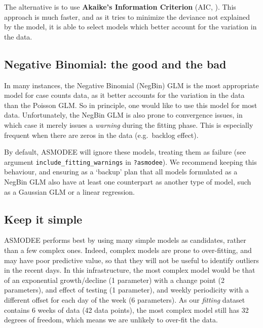\documentclass[]{book}
\begin{document}
The alternative is to use \textbf{Akaike's Information Criterion} (AIC,
\citep{Akaike1974-gm}). This approach is much faster, and as it tries to minimize the
deviance not explained by the model, it is able to select models which better
account for the variation in the data.

\hypertarget{negative-binomial-the-good-and-the-bad}{%
\subsection{Negative Binomial: the good and the bad}\label{negative-binomial-the-good-and-the-bad}}

In many instances, the Negative Binomial (NegBin) GLM is the most appropriate
model for case counts data, as it better accounts for the variation in the data
than the Poisson GLM. So in principle, one would like to use this model for most
data. Unfortunately, the NegBin GLM is also prone to convergence issues, in
which case it merely issues a \emph{warning} during the fitting phase. This is
especially frequent when there are zeros in the data (e.g.~backlog effect).

By default, ASMODEE will ignore these models, treating them as failure (see
argument \texttt{include\_fitting\_warnings} in \texttt{?asmodee}). We recommend keeping this
behaviour, and ensuring as a `backup' plan that all models formulated as a
NegBin GLM also have at least one counterpart as another type of model, such as
a Gaussian GLM or a linear regression.

\hypertarget{keep-it-simple}{%
\subsection{Keep it simple}\label{keep-it-simple}}

ASMODEE performs best by using many simple models as candidates, rather than a
few complex ones. Indeed, complex models are prone to over-fitting, and may have
poor predictive value, so that they will not be useful to identify outliers in
the recent days. In this infrastructure, the most complex model would be that of
an exponential growth/decline (1 parameter) with a change point (2 parameters),
and effect of testing (1 parameter), and weekly periodicity with a different
offset for each day of the week (6 parameters). As our \emph{fitting} dataset
contains 6 weeks of data (42 data points), the most complex model still has 32
degrees of freedom, which means we are unlikely to over-fit the data.
\end{document}
